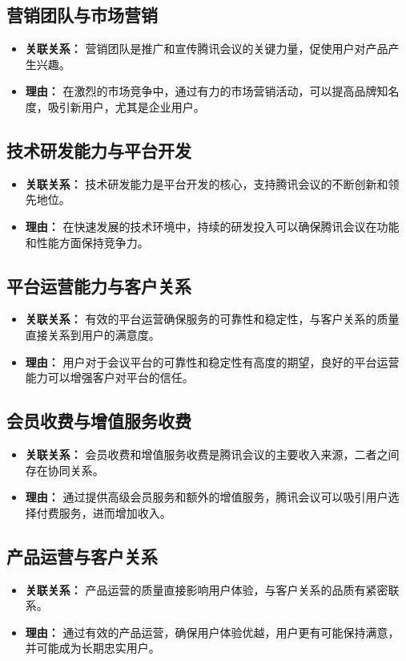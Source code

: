 \documentclass[a4paper,12pt]{article}
\begin{document}
\subsection{营销团队与市场营销}
\begin{itemize}
\item\textbf{关联关系：} 营销团队是推广和宣传腾讯会议的关键力量，促使用户对产品产生兴趣。 
\item\textbf{理由：} 在激烈的市场竞争中，通过有力的市场营销活动，可以提高品牌知名度，吸引新用户，尤其是企业用户。
\end{itemize}
\subsection{技术研发能力与平台开发}
\begin{itemize}
\item\textbf{关联关系：} 技术研发能力是平台开发的核心，支持腾讯会议的不断创新和领先地位。 
\item\textbf{理由：} 在快速发展的技术环境中，持续的研发投入可以确保腾讯会议在功能和性能方面保持竞争力。
\end{itemize}
\subsection{平台运营能力与客户关系}
\begin{itemize}
\item\textbf{关联关系：} 有效的平台运营确保服务的可靠性和稳定性，与客户关系的质量直接关系到用户的满意度。 
\item\textbf{理由：} 用户对于会议平台的可靠性和稳定性有高度的期望，良好的平台运营能力可以增强客户对平台的信任。
\end{itemize}
\subsection{会员收费与增值服务收费}
\begin{itemize}
\item\textbf{关联关系：} 会员收费和增值服务收费是腾讯会议的主要收入来源，二者之间存在协同关系。 
\item\textbf{理由：} 通过提供高级会员服务和额外的增值服务，腾讯会议可以吸引用户选择付费服务，进而增加收入。
\end{itemize}
\subsection{产品运营与客户关系}
\begin{itemize}
\item\textbf{关联关系：} 产品运营的质量直接影响用户体验，与客户关系的品质有紧密联系。 
\item\textbf{理由：} 通过有效的产品运营，确保用户体验优越，用户更有可能保持满意，并可能成为长期忠实用户。
\end{itemize}
\end{document}
